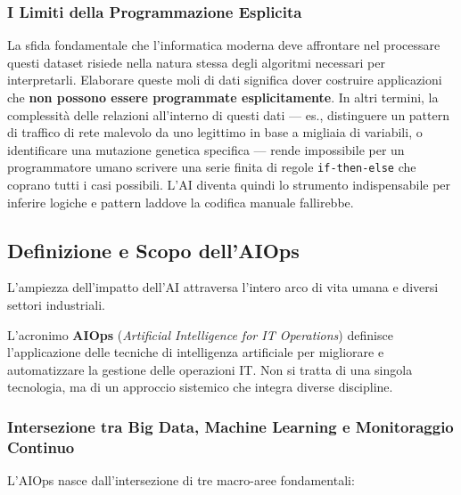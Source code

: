 \subsubsection{I Limiti della Programmazione Esplicita}

La sfida fondamentale che l'informatica moderna deve affrontare nel
processare questi dataset risiede nella natura stessa degli algoritmi
necessari per interpretarli. Elaborare queste moli di dati significa
dover costruire applicazioni che \textbf{non possono essere programmate
esplicitamente}. In altri termini, la complessità delle relazioni
all'interno di questi dati --- es., distinguere un pattern di traffico
di rete malevolo da uno legittimo in base a migliaia di variabili, o
identificare una mutazione genetica specifica --- rende impossibile per
un programmatore umano scrivere una serie finita di regole
\texttt{if-then-else} che coprano tutti i casi possibili. L'AI diventa
quindi lo strumento indispensabile per inferire logiche e pattern
laddove la codifica manuale fallirebbe.

\subsection{Definizione e Scopo dell'AIOps}

L'ampiezza dell'impatto dell'AI attraversa l'intero arco di vita umana e
diversi settori industriali.

L'acronimo \textbf{AIOps} (\textit{Artificial Intelligence for IT
Operations}) definisce l'applicazione delle tecniche di intelligenza
artificiale per migliorare e automatizzare la gestione delle operazioni
IT. Non si tratta di una singola tecnologia, ma di un approccio
sistemico che integra diverse discipline.

\subsubsection{Intersezione tra Big Data, Machine Learning e Monitoraggio Continuo}

L'AIOps nasce dall'intersezione di tre macro-aree fondamentali:

